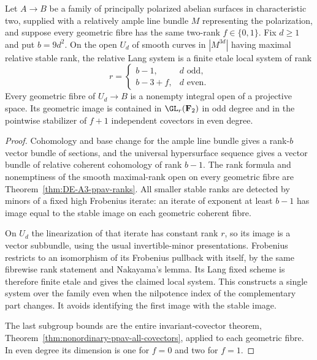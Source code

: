 \begin{lemma}
\label{lem:ppav-family-constant-rank-Lang-candidate}
Let $A\to B$ be a family of principally polarized abelian
surfaces in characteristic two, supplied with a relatively
ample line bundle $M$ representing the polarization, and
suppose every geometric fibre has the same two-rank
$f\in\{0,1\}$. Fix $d\ge1$ and put $b=9d^2$.
On the open $U_d$ of smooth curves in $|M^{3d}|$ having
maximal relative stable rank, the relative Lang system is a
finite etale local system of rank
\[
 r=\begin{cases}b-1,&d\text{ odd},\\ b-3+f,&d\text{ even}.
 \end{cases}
\]
Every geometric fibre of $U_d\to B$ is a nonempty integral
open of a projective space. Its geometric image is contained
in $\GL_r(\mathbf F_2)$ in odd degree and in the pointwise
stabilizer of $f+1$ independent covectors in even degree.
\end{lemma}

\begin{proof}
Cohomology and base change for the ample line bundle gives
a rank-$b$ vector bundle of sections, and the universal
hypersurface sequence gives a vector bundle of relative
coherent cohomology of rank $b-1$. The rank formula and
nonemptiness of the smooth maximal-rank open on every
geometric fibre are Theorem~\ref{thm:DE-A3-ppav-ranks}.
All smaller stable ranks are detected by minors of a fixed
high Frobenius iterate: an iterate of exponent at least
$b-1$ has image equal to the stable image on each geometric
coherent fibre.

On $U_d$ the linearization of that iterate has constant rank
$r$, so its image is a vector subbundle, using the usual
invertible-minor presentations. Frobenius restricts to an
isomorphism of its Frobenius pullback with itself, by the
same fibrewise rank statement and Nakayama's lemma. Its
Lang fixed scheme is therefore finite etale and gives the
claimed local system. This constructs a single system over
the family even when the nilpotence index of the complementary
part changes. It avoids identifying the first image with
the stable image.

The last subgroup bounds are the entire invariant-covector
theorem, Theorem~\ref{thm:nonordinary-ppav-all-covectors},
applied to each geometric fibre. In even degree its
dimension is one for $f=0$ and two for $f=1$.
\end{proof}

